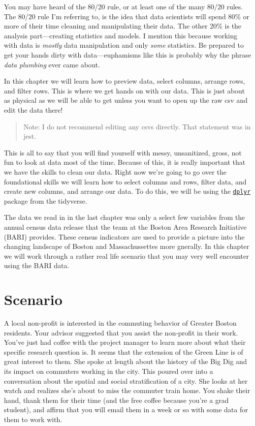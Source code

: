 \documentclass[
]{book}
\begin{document}
You may have heard of the 80/20 rule, or at least one of the many 80/20 rules. The 80/20 rule I'm referring to, is the idea that data scientists will spend 80\% or more of their time cleaning and manipulating their data. The other 20\% is the analysis part---creating statistics and models. I mention this because working with data is \emph{mostly} data manipulation and only \emph{some} statistics. Be prepared to get your hands dirty with data---euphamisms like this is probably why the phrase \emph{data plumbing} ever came about.

In this chapter we will learn how to preview data, select columns, arrange rows, and filter rows. This is where we get hands on with our data. This is just about as physical as we will be able to get unless you want to open up the raw csv and edit the data there!

\begin{quote}
Note: I do not recommend editing any csvs directly. That statement was in jest.
\end{quote}

This is all to say that you will find yourself with messy, unsanitized, gross, not fun to look at data most of the time. Because of this, it is really important that we have the skills to clean our data. Right now we're going to go over the foundational skills we will learn how to select columns and rows, filter data, and create new columns, and arrange our data. To do this, we will be using the \href{https://dplyr.tidyverse.org}{\texttt{dplyr}} package from the tidyverse.

The data we read in in the last chapter was only a select few variables from the annual census data release that the team at the Boston Area Research Initiative (BARI) provides. These census indicators are used to provide a picture into the changing landscape of Boston and Massachussettes more gnerally. In this chapter we will work through a rather real life scenario that you may very well encounter using the BARI data.

\hypertarget{scenario}{%
\section{Scenario}\label{scenario}}

A local non-profit is interested in the commuting behavior of Greater Boston residents. Your advisor suggested that you assist the non-profit in their work. You've just had coffee with the project manager to learn more about what their specific research question is. It seems that the extension of the Green Line is of great interest to them. She spoke at length about the history of the Big Dig and its impact on commuters working in the city. This poured over into a conversation about the spatial and social stratification of a city. She looks at her watch and realizes she's about to miss the commuter train home. You shake their hand, thank them for their time (and the free coffee because you're a grad student), and affirm that you will email them in a week or so with some data for them to work with.
\end{document}
